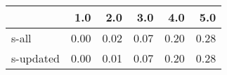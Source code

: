 \begin{tabular}{lrrrrr}
\toprule
{} &  1.0 &  2.0 &  3.0 &  4.0 &  5.0 \\
\midrule
s-all     & 0.00 & 0.02 & 0.07 & 0.20 & 0.28 \\
s-updated & 0.00 & 0.01 & 0.07 & 0.20 & 0.28 \\
\bottomrule
\end{tabular}
